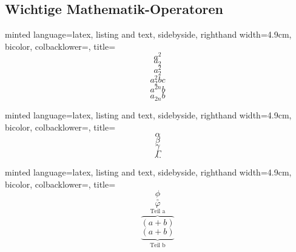 \documentclass[
    ngerman,
    accentcolor=3b,
    dark_mode,
    fontsize= 12pt,
    a4paper,
    aspectratio=169,
    colorback=true,
    fancy_row_colors,
    leqno,
    fleqn,
    boxarc=3pt,
    fleqn,
]{algoslides}
\begin{document}
    \subsection{Wichtige Mathematik-Operatoren}
    \begin{frame}[c, fragile]
        \slidehead{}
        \begin{codeBlock}[
            ]{
            minted language=latex,
            listing and text,
            sidebyside,
            righthand width=4.9cm,
            bicolor,
            colbacklower=,
            title=
            }
            $$a^2$$ %
            $$a_2$$ %
            $$a^2_2$$ %
            $$a_2^2bc$$
            $$a^{2n}b$$
            $$a_{2n}b$$
        \end{codeBlock}
    \end{frame}

    \begin{frame}[c, fragile]
        \slidehead{}
        \begin{codeBlock}[
            ]{
            minted language=latex,
            listing and text,
            sidebyside,
            righthand width=4.9cm,
            bicolor,
            colbacklower=,
            title=
            }
            $$\alpha$$
            $$\beta$$
            $$\gamma$$
            $$\Gamma$$
            $$\dots$$
        \end{codeBlock}
    \end{frame}

    \begin{frame}[c, fragile]
        \slidehead{}
        \begin{codeBlock}[
            ]{
            minted language=latex,
            listing and text,
            sidebyside,
            righthand width=4.9cm,
            bicolor,
            colbacklower=,
            title=
            }
            $$\underline{\phi}$$
            $$\overline{\varphi}$$
            $$\overbrace{(a+b)}^{\text{Teil a}}$$
            $$\underbrace{(a+b)}_{\text{Teil b}}$$
        \end{codeBlock}
    \end{frame}
\end{document}
